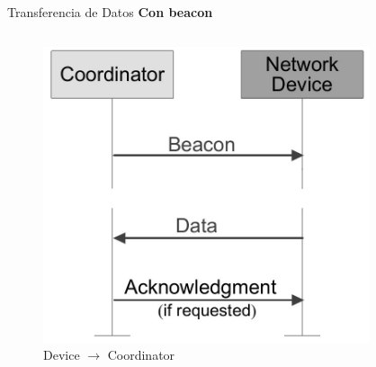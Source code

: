 \documentclass[aspectratio=169, handout]{beamer}
\begin{document}
\begin{frame}[t]{Transferencia de Datos}
\textbf{Con beacon}
\begin{columns}[t]
	\begin{column}{.5\textwidth}
		\begin{minipage}[t][0.7\textheight][s]{\columnwidth}
			\begin{figure}[H]
				\includegraphics[height=.65\textheight]{./imagenes/dev-coord-beacon.jpg}
				\vfill
				\vspace{10px}
				\caption{Device $\rightarrow$ Coordinator}
			\end{figure}
		\end{minipage}
	\end{column}
	\begin{column}{.5\textwidth}
		\begin{minipage}[t][0.7\textheight][s]{\columnwidth}
			\begin{figure}[H]

\end{figure}
\end{minipage}
\end{column}
\end{columns}
\end{frame}
\end{document}
